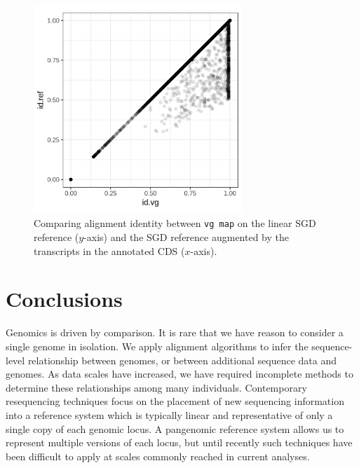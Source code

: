 \documentclass[a4paper,12pt,numbered,oneside]{Classes/PhDThesisPSnPDF}
\begin{document}
\begin{figure}[htbp!]
  \centering
  \includegraphics[width=0.7\textwidth]{Chapter3/Figs/SRR2069949_100k_ref_vs_gene_model.png}
  \caption[Aligning reads against the yeast transcriptome]{
    Comparing alignment identity between {\tt vg map} on the linear SGD reference ($y$-axis) and the SGD reference augmented by the transcripts in the annotated CDS ($x$-axis).
   }
  \label{fig:yeast_rnaseq}
\end{figure}



%
%
\chapter{Conclusions}

\ifpdf
    \graphicspath{{Chapter3/Figs/Raster/}{Chapter3/Figs/PDF/}{Chapter3/Figs/}}
\else
    \graphicspath{{Chapter3/Figs/Vector/}{Chapter3/Figs/}}
\fi

Genomics is driven by comparison.
It is rare that we have reason to consider a single genome in isolation.
We apply alignment algorithms to infer the sequence-level relationship between genomes, or between additional sequence data and genomes.
As data scales have increased, we have required incomplete methods to determine these relationships among many individuals.
Contemporary resequencing techniques focus on the placement of new sequencing information into a reference system which is typically linear and representative of only a single copy of each genomic locus.
A pangenomic reference system allows us to represent multiple versions of each locus, but until recently such techniques have been difficult to apply at scales commonly reached in current analyses.
\end{document}
